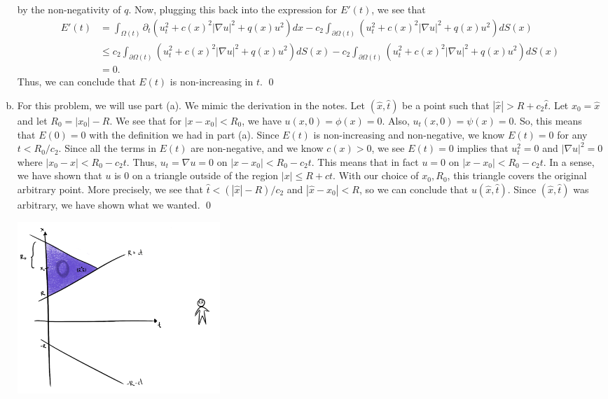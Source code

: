 \documentclass{article}
\newcommand{\D}{\nabla}
\renewcommand{\d}{\partial}
\begin{document}
\begin{enumerate}[(a)]
    by the non-negativity of $q$. Now, plugging this back into the expression for $E'(t)$, we see that 
    \begin{align*}
        E'(t) &= \int_{\Omega(t)}\d_t(u_t^2 + c(x)^2|\D u |^2 + q(x)u^2) dx   -c_2\int_{\d\Omega(t)}(u_t^2 + c(x)^2|\D u |^2 + q(x)u^2) dS(x) \\
        &\le c_2\int_{\d\Omega(t)}(u_t^2 + c(x)^2|\D u |^2 + q(x)u^2) dS(x)-c_2\int_{\d\Omega(t)}(u_t^2 + c(x)^2|\D u |^2 + q(x)u^2) dS(x)\\
        &=  0.
    \end{align*}
    Thus, we can conclude that $E(t)$ is non-increasing in $t$. \qed
    \item For this problem, we will use part (a). We mimic the derivation in the notes. 
    \hop 
    Let $(\hat{x},\hat{t})$ be a point such that $|\hat{x}| > R+c_2\hat{t}$. Let $x_0 = \hat{x}$ and let $R_0 = |x_0| - R$. We see that for $|x-x_0| < R_0$, we have $u(x,0) = \phi(x) = 0$. Also, $u_t(x,0) = \psi(x)  = 0$. So, this means that $E(0) = 0$ with the definition we had in part (a). 
    \hop 
    Since $E(t)$ is non-increasing and non-negative, we know $E(t) = 0$ for any $t < R_0/c_2$. Since all the terms in $E(t)$ are non-negative, and we know $c(x) >0$, we see $E(t) = 0$ implies that $u_t^2 = 0$ and $|\D u|^2 = 0$ where $|x_0 -x| < R_0 - c_2t$. Thus, $u_t =  \D u = 0$ on $|x -x_0| < R_0 - c_2t$. This means that in fact $u = 0$ on $|x -x_0| < R_0 - c_2t$. 
    \hop 
    In a sense, we have shown that $u$ is 0 on a triangle outside of the region $|x| \le R + ct$. With our choice of $x_0, R_0$, this triangle covers the original arbitrary point. 
    \hop 
    More precisely, we see that $\hat{t} < (|\hat{x}| - R)/c_2$ and $|\hat{x} -x_0| < R$, so we can conclude that $u(\hat{x}, \hat{t})$. Since $(\hat{x},\hat{t})$ was arbitrary, we have shown what we wanted. \qed 
    \begin{center}
        \includegraphics[height=6.5cm]{../images/0void2}
    \end{center}


\end{enumerate}
\end{document}
